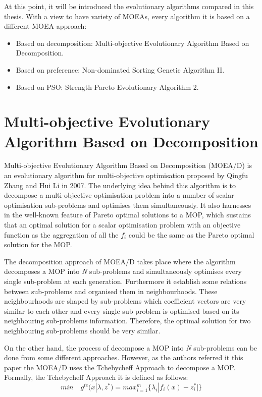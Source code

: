
At this point, it will be introduced the evolutionary algorithms compared in this thesis. With a view to have variety of MOEAs, every algorithm it is based on a different MOEA approach\cite{ZHOU201132}:

\begin{itemize}
    \item Based on decomposition: Multi-objective Evolutionary Algorithm Based on Decomposition.
    \item Based on preference: Non-dominated Sorting Genetic Algorithm II.
    \item Based on PSO: Strength Pareto Evolutionary Algorithm 2. 
\end{itemize}

\section{Multi-objective Evolutionary Algorithm Based on Decomposition}
Multi-objective Evolutionary Algorithm Based on Decomposition (MOEA/D) is an evolutionary algorithm for multi-objective optimisation proposed by Qingfu Zhang and Hui Li in 2007\cite{Zhang2007}. The underlying idea behind this algorithm is to decompose a multi-objective optimisation problem into a number of scalar optimisation sub-problems and optimises them simultaneously. It also harnesses in the well-known feature of Pareto optimal solutions to a MOP, which sustains that an optimal solution for a scalar optimisation problem with an objective function as the aggregation of all the $f_{i}$ could be the same as the Pareto optimal solution for the MOP\cite{Zhang2007}.

The decomposition approach of MOEA/D takes place where the algorithm decomposes a MOP into \textit{N} sub-problems and simultaneously optimises every single sub-problem at each generation. Furthermore it establish some relations between sub-problems and organised them in neighbourhoods. These neighbourhoods are shaped by sub-problems which coefficient vectors are very similar to each other and every single sub-problem is optimised based on its neighbouring sub-problems information. Therefore, the optimal solution for two neighbouring sub-problems should be very similar\cite{Zhang2007}.

On the other hand, the process of decompose a MOP into \textit{N} sub-problems can be done from some different approaches. However, as the authors referred\cite{Zhang2007} it this paper the MOEA/D uses the Tchebycheff Approach\cite{Ma2018} to decompose a MOP. Formally, the Tchebycheff Approach it is defined as follows:
\[
min\quad g^{te}(x|\lambda,z^{*}) = max_{i=1}^{m}\{\lambda_{i}|f_{i}(x)-z_{i}^{*}|\}
\]

